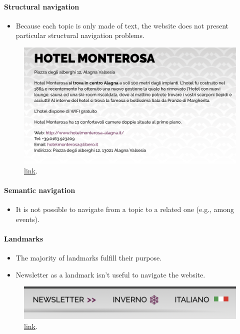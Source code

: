\documentclass[a4paper, 11pt, parskip=half, headsepline]{scrreprt}
\begin{document}
\paragraph{Structural navigation}
\begin{itemize}
    \item Because each topic is only made of text, the website does not present particular structural navigation problems.
\end{itemize}

\begin{figure}[H]
        \centering
        \includegraphics[width=0.5\linewidth, keepaspectratio]{structural1.png}
        \caption{\href{https://www.visitmonterosa.com/accommodation/hotel-monterosa/}{link}.}
        \label{fig:interaction-consistency-05}
\end{figure}

\paragraph{Semantic navigation}
\begin{itemize}
    \item It is not possible to navigate from a topic to a related one (e.g., among events).
\end{itemize}

\paragraph{Landmarks}
\begin{itemize}
    \item The majority of landmarks fulfill their purpose.
    \item Newsletter as a landmark isn't useful to navigate the website.
\end{itemize}

\begin{figure}[H]
        \centering
        \includegraphics[width=0.3\linewidth, keepaspectratio]{landmarks1.png}
        \caption{\href{https://www.visitmonterosa.com}{link}.}
        \label{fig:landmarks-1}
\end{figure}
\end{document}
